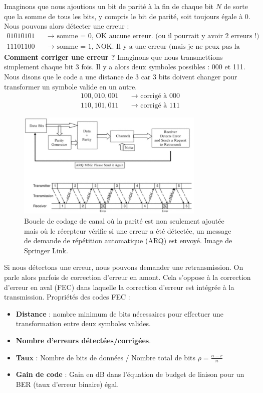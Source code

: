 Imaginons que nous ajoutions un bit de parité à la fin de chaque bit $N$ de sorte que la somme de tous les bits, y compris le bit de parité, soit toujours égale à 0. Nous pouvons alors détecter une erreur :
\begin{align*}
01010101 &\quad \text{→ somme = 0, OK aucune erreur. (ou il pourrait y avoir 2 erreurs !)} \\
11101100 &\quad \text{→ somme = 1, NOK. Il y a une erreur (mais je ne peux pas la corriger)}
\end{align*}
\textbf{Comment corriger une erreur ?}  
Imaginons que nous transmettions simplement chaque bit 3 fois. Il y a alors deux symboles possibles : 000 et 111. Nous disons que le code a une distance de 3 car 3 bits doivent changer pour transformer un symbole valide en un autre.
\begin{align*}
100, 010, 001 &\quad \text{→ corrigé à 000} \\
110, 101, 011 &\quad \text{→ corrigé à 111}
\end{align*}
\begin{figure}[H] %
    \centering
    \includegraphics[width=0.8\textwidth]{figures/6-25.jpg}
    \caption{Boucle de codage de canal où la parité est non seulement ajoutée mais où le récepteur vérifie si une erreur a été détectée, un message de demande de répétition automatique (ARQ) est envoyé. Image de Springer Link.}
    \label{fig:communication2}
\end{figure}
Si nous détectons une erreur, nous pouvons demander une retransmission. On parle alors parfois de correction d'erreur en amont. Cela s'oppose à la correction d'erreur en aval (FEC) dans laquelle la correction d'erreur est intégrée à la transmission. 
Propriétés des codes FEC :
\begin{itemize}
    \item \textbf{Distance} : nombre minimum de bits nécessaires pour effectuer une transformation entre deux symboles valides.
    \item \textbf{Nombre d'erreurs détectées/corrigées}.
    \item \textbf{Taux} : Nombre de bits de données / Nombre total de bits  
          \( \rho = \frac{n - r}{n} \)
    \item \textbf{Gain de code} : Gain en dB dans l'équation de budget de liaison pour un BER (taux d'erreur binaire) égal.
\end{itemize}
